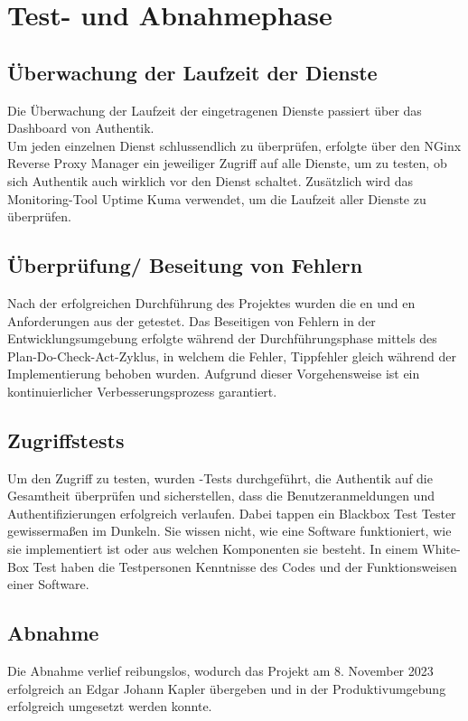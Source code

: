 \section{Test- und Abnahmephase}
\label{sec:Testphase}

\subsection{Überwachung der Laufzeit der Dienste}
\label{sec:Überwachung der Laufzeit der Dienste}
Die Überwachung der Laufzeit der eingetragenen Dienste passiert über das Dashboard von Authentik.
\\Um jeden einzelnen Dienst schlussendlich zu überprüfen, erfolgte über den NGinx Reverse Proxy Manager ein jeweiliger Zugriff auf alle Dienste, um 
zu testen, ob sich Authentik auch wirklich vor den Dienst schaltet. Zusätzlich wird das Monitoring-Tool Uptime Kuma verwendet, um die 
Laufzeit aller Dienste zu überprüfen.

\subsection{Überprüfung/ Beseitung von Fehlern}
\label{sec:Überprüfung/ Beseitung von Fehlern}
Nach der erfolgreichen Durchführung des Projektes wurden die en und en Anforderungen aus der 
 getestet. Das Beseitigen von Fehlern in der Entwicklungsumgebung erfolgte während der Durchführungsphase 
mittels des Plan-Do-Check-Act-Zyklus, in welchem die Fehler, \zB Tippfehler gleich während der Implementierung behoben wurden.
Aufgrund dieser Vorgehensweise ist ein kontinuierlicher Verbesserungsprozess garantiert.


\subsection{Zugriffstests}
\label{sec:Zugriffstests}
Um den Zugriff zu testen, wurden \cite{BoxTests}-Tests durchgeführt, die Authentik auf die Gesamtheit überprüfen und 
sicherstellen, dass die Benutzeranmeldungen und Authentifizierungen erfolgreich verlaufen. Dabei tappen ein Blackbox Test 
Tester gewissermaßen im Dunkeln. Sie wissen nicht, wie eine Software funktioniert, wie sie implementiert ist oder 
aus welchen Komponenten sie besteht. In einem White-Box Test haben die Testpersonen Kenntnisse des Codes und der 
Funktionsweisen einer Software.

\subsection{Abnahme}
\label{sec:Abnahme}

Die Abnahme verlief reibungslos, wodurch das Projekt am 8. November 2023 erfolgreich an Edgar Johann 
Kapler übergeben und in der Produktivumgebung erfolgreich umgesetzt werden konnte.